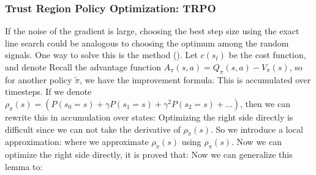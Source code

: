 \documentclass[12pt]{report}
\begin{document}
\subsubsection{Trust Region Policy Optimization: TRPO}
If the noise of the gradient is large, choosing the best step size using the exact line search could be analogous to choosing the optimum among the random signals.
One way to solve this is the  method (\cite{schulman2015trust}). Let $c(s_t)$ be the cost function, and denote
Recall the advantage function $A_\pi(s,a)=Q_\pi(s,a)-V_\pi(s)$, so for another policy $\tilde{\pi}$, we have the improvement formula:
This is accumulated over timesteps. If we denote $\rho_{\pi}(s)=(P(s_0=s)+\gamma P(s_1=s)+\gamma^2P(s_2=s)+\ldots)$, then we can rewrite this in accumulation over states:
Optimizing the right side directly is difficult since we can not take the derivative of $\rho_{\tilde{\pi}}(s)$. So we introduce a local approximation:
where we approximate $\rho_{\tilde{\pi}}(s)$ using $\rho_{\pi}(s)$. Now we can optimize the right side directly, it is proved that:
Now we can generalize this lemma to:
\end{document}
